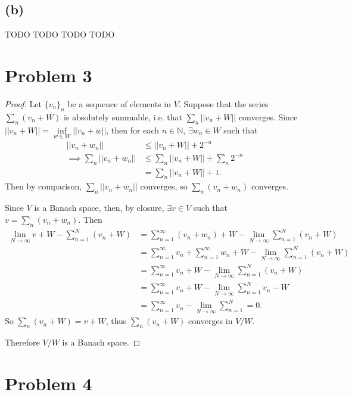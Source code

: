 \documentclass{article}
\begin{document}
\subsection*{(b)}
TODO TODO TODO TODO

\section*{Problem 3}
\begin{proof}
	Let $\{v_n\}_n$ be a sequence of elements in $V$. Suppose that the series $\sum_{n}(v_n+W)$ is absolutely summable, i.e. that $\sum_{n}||v_n + W||$ converges. Since $||v_n + W|| = \inf\limits_{w\in W}||v_n + w||$, then for each $n\in \mathbb{N}$, $\exists w_n \in W$ such that 
	\begin{align}
		||v_n + w_n|| &\leq ||v_n + W|| + 2^{-n} \\
		\implies \sum_{n}||v_n + w_n|| &\leq \sum_{n}||v_n + W|| + \sum_{n}2^{-n} \\
		&= \sum_n ||v_n + W|| + 1.
	\end{align}
	Then by comparison, $\sum_n ||v_n + w_n||$ converges, so $\sum_n (v_n + w_n)$ converges.
	
	Since $V$ is a Banach space, then, by closure, $\exists v \in V$ such that \\ $v = \sum_n (v_n + w_n)$. Then
	\begin{align}
		\lim_{N\to\infty} v+ W - \sum_{n=1}^N (v_n + W) &= \sum_{n=1}^{\infty} (v_n + w_n) + W - \lim_{N\to\infty}\sum_{n=1}^N(v_n + W) \\
		&= \sum_{n=1}^{\infty}v_n + \sum_{n=1}^{\infty}w_n + W -\lim_{N\to\infty}\sum_{n=1}^N(v_n + W) \\
		&= \sum_{n=1}^{\infty}v_n + W -\lim_{N\to\infty}\sum_{n=1}^{N}(v_n + W) \\
		&= \sum_{n=1}^{\infty}v_n + W -\lim_{N\to\infty}\sum_{n=1}^{N} v_n - W \\
		&= \sum_{n=1}^{\infty}v_n - \lim_{N\to\infty}\sum_{n=1}^{N} = 0.
	\end{align}
	So $\sum_n (v_n + W) = v+W$, thus $\sum_n (v_n + W)$ converges in $V/W$.
	
	Therefore $V/W$ is a Banach space.
\end{proof}

\section*{Problem 4}
\end{document}
